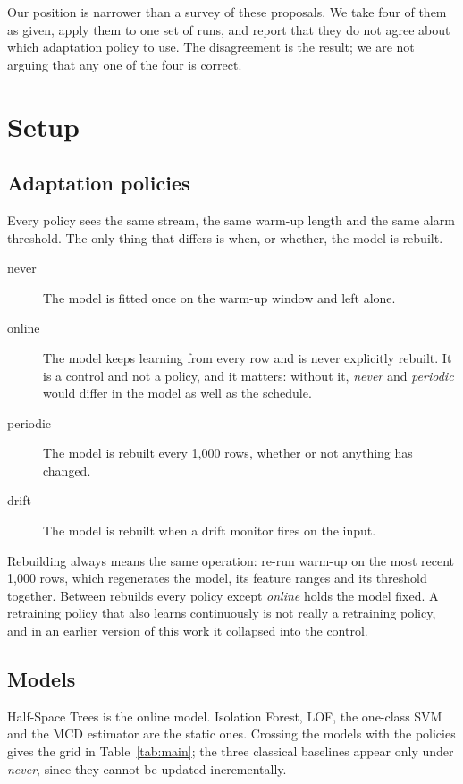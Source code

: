 \documentclass[11pt,a4paper]{article}
\begin{document}
Our position is narrower than a survey of these proposals. We take four of them
as given, apply them to one set of runs, and report that they do not agree about
which adaptation policy to use. The disagreement is the result; we are not
arguing that any one of the four is correct.

\section{Setup}

\subsection{Adaptation policies}

Every policy sees the same stream, the same warm-up length and the same alarm
threshold. The only thing that differs is when, or whether, the model is
rebuilt.

\begin{description}
\item[never] The model is fitted once on the warm-up window and left alone.
\item[online] The model keeps learning from every row and is never explicitly
  rebuilt. It is a control and not a policy, and it matters: without it,
  \emph{never} and \emph{periodic} would differ in the model as well as the
  schedule.
\item[periodic] The model is rebuilt every 1{,}000 rows, whether or not
  anything has changed.
\item[drift] The model is rebuilt when a drift monitor fires on the input.
\end{description}

Rebuilding always means the same operation: re-run warm-up on the most recent
1{,}000 rows, which regenerates the model, its feature ranges and its threshold
together. Between rebuilds every policy except \emph{online} holds the model
fixed. A retraining policy that also learns continuously is not really a
retraining policy, and in an earlier version of this work it collapsed into the
control.

\subsection{Models}

Half-Space Trees is the online model. Isolation Forest, LOF, the one-class SVM
and the MCD estimator are the static ones. Crossing the models with the policies
gives the grid in Table~\ref{tab:main}; the three classical baselines appear
only under \emph{never}, since they cannot be updated incrementally.
\end{document}
